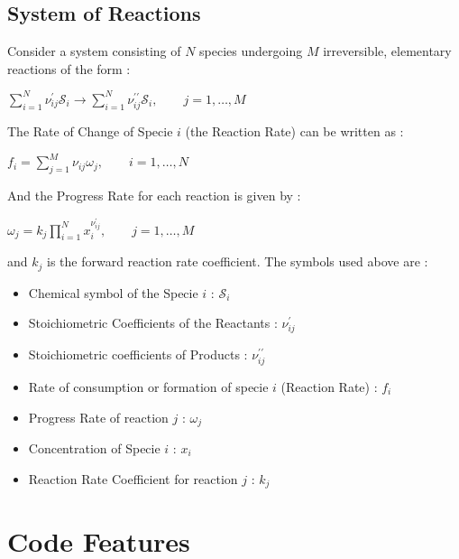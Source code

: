 \subsection{System of Reactions}
Consider a system consisting of $N$ species undergoing $M$ irreversible, elementary reactions of the form :
\begin{center}
     $\sum_{i=1}^{N}{\nu_{ij}^{\prime}\mathcal{S}_{i}} \longrightarrow 
  \sum_{i=1}^{N}{\nu_{ij}^{\prime\prime}\mathcal{S}_{i}}, \qquad j = 1, \ldots, M$
\end{center}
\vspace{0.7in}The Rate of Change of Specie $i$ (the Reaction Rate) can be written as :\begin{center}
     $f_{i} = \sum_{j=1}^{M}{\nu_{ij}\omega_{j}}, \qquad i = 1, \ldots, N$
\end{center}
And the Progress Rate for each reaction is given by :\begin{center}
  $\omega_{j} = k_{j}\prod_{i=1}^{N}{x_{i}^{\nu_{ij}^{\prime}}}, \qquad j = 1, \ldots, M$
\end{center}
and $k_{j}$ is the forward reaction rate coefficient. The symbols used above are :
\begin{itemize}
    \item Chemical symbol of the Specie $i$ : $\mathcal{S}_{i}$
    \item Stoichiometric Coefficients of the Reactants : $\nu_{ij}^{\prime}$
    \item Stoichiometric coefficients of Products : $\nu_{ij}^{\prime\prime}$ 
    \item Rate of consumption or formation of specie $i$ (Reaction Rate) : $f_{i}$ 
    \item Progress Rate of reaction $j$ : $\omega_{j}$
    \item Concentration of Specie $i$ : $x_{i}$
    \item Reaction Rate Coefficient for reaction $j$ : $k_{j}$ 
\end{itemize}
\section{Code Features}

